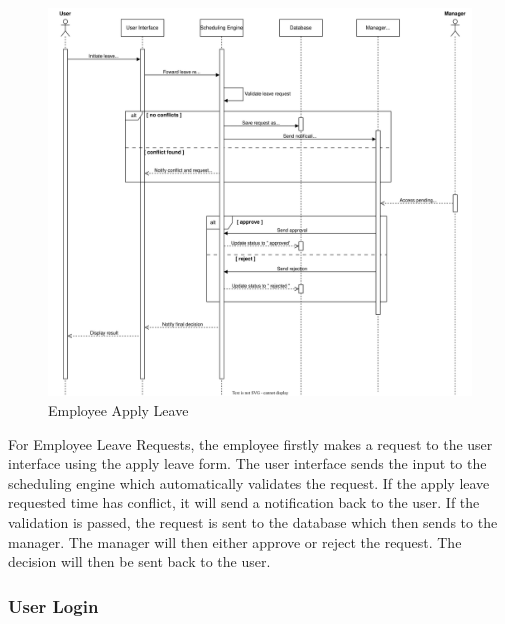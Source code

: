 \documentclass[a4paper,12pt, oneside]{report}
\begin{document}
\begin{figure}[H]
    \centering
    \includegraphics[width=\linewidth]{UMLDiagrams/staffLeaveRequest_white.jpg}
    \caption{Employee Apply Leave}
    \label{fig:apply-leave}
\end{figure}

For Employee Leave Requests, the employee firstly makes a request to the user interface using the apply leave form. The user interface sends the input to the scheduling engine which automatically validates the request. If the apply leave requested time has conflict, it will send a notification back to the user. If the validation is passed, the request is sent to the database which then sends to the manager. The manager will then either approve or reject the request. The decision will then be sent back to the user.

\subsubsection{User Login}
\end{document}
